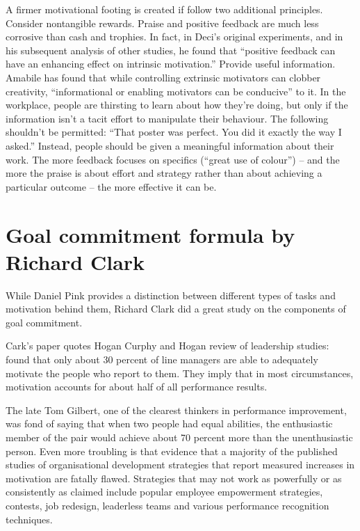 \begin{compactitem}
A firmer motivational footing is created if follow two additional principles.
\subitem Consider nontangible rewards. Praise and positive feedback are much less corrosive than cash and trophies. In fact, in Deci’s original experiments, and in his subsequent analysis of other studies, he found that ``positive feedback can have an enhancing effect on intrinsic motivation.''
\subitem Provide useful information. Amabile has found that while controlling extrinsic motivators can clobber creativity, ``informational or enabling motivators can be conducive'' to it. In the workplace, people are thirsting to learn about how they’re doing, but only if the information isn’t a tacit effort to manipulate their behaviour. The following shouldn't be permitted: ``That poster was perfect. You did it exactly the way I asked.'' Instead, people should be given a meaningful information about their work. The more feedback focuses on specifics (``great use of colour'') -- and the more the praise is about effort and strategy rather than about achieving a particular outcome -- the more effective it can be.
\end{compactitem}

\section{Goal commitment formula by Richard Clark}

While Daniel Pink provides a distinction between different types of tasks and motivation behind them, Richard Clark did a great study on the components of goal commitment. 

Cark's paper quotes Hogan Curphy and Hogan review of leadership studies: found that only about 30 percent of line managers are able to adequately motivate the people who report to them. They imply that in most circumstances, motivation accounts for about half of all performance results.

The late Tom Gilbert, one of the clearest thinkers in performance improvement, was fond of saying that when two people had equal abilities, the enthusiastic member of the pair would achieve about 70 percent more than the unenthusiastic person. Even more troubling is that evidence that a majority of the published studies of organisational development strategies that report measured increases in motivation are fatally flawed. Strategies that may not work as powerfully or as consistently as claimed include popular employee empowerment strategies, contests, job redesign, leaderless teams and various performance recognition techniques.

